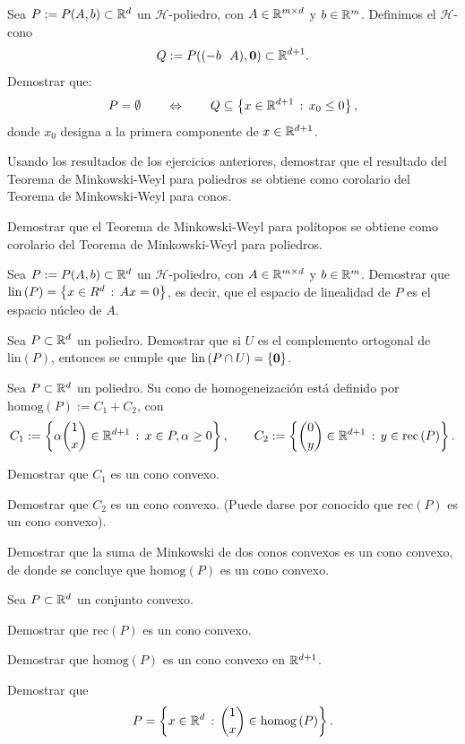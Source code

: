 \documentclass[a4paper,12pt]{article}
\newcommand{\colvector}[2]{{#1 \choose #2}}
\renewcommand{\lin}[1]{\mathrm{lin}\left(#1\right)}
\newcommand{\homog}[1]{\mathrm{homog}\left(#1\right)}
\newcommand{\rec}[1]{\mathrm{rec}\left(#1\right)}
\newcommand{\HH}{\mathcal{H}}
\begin{document}
\begin{exerciselist}
  \item Sea $P:= P(A, b) \subset \mathbb{R}^d$ un $\HH$-poliedro, con $A \in \mathbb{R}^{m \times d}$ y $b \in \mathbb{R}^m$. Definimos el $\HH$-cono
  $$
  Q := P((-b \,\,\,\, A), \mathord{\bf 0}) \subset \mathbb{R}^{d+1}.
  $$
  Demostrar que:
  $$
  P = \emptyset
  \qquad \Leftrightarrow \qquad
  Q \subseteq \left\{ x \in \mathbb{R}^{d+1} \, : \, x_0 \leq 0 \right\},
  $$
  donde $x_0$ designa a la primera componente de $x \in \mathbb{R}^{d+1}$.

  \item Usando los resultados de los ejercicios anteriores, demostrar que el resultado del Teorema de Minkowski-Weyl para poliedros se obtiene como corolario del Teorema de Minkowski-Weyl para conos.

  \item Demostrar que el Teorema de Minkowski-Weyl para polítopos se obtiene como corolario del Teorema de Minkowski-Weyl para poliedros.

  \item Sea $P:=P(A,b) \subset \mathbb{R}^d$ un $\HH$-poliedro, con $A \in \mathbb{R}^{m \times d}$ y $b \in \mathbb{R}^m$. Demostrar que $\lin{P} = \setof{x \in R^d}{Ax=0}$, es decir, que el espacio de linealidad de $P$ es el espacio núcleo de $A$.

  \item Sea $P \subset \mathbb{R}^d$ un poliedro. Demostrar que si $U$ es el complemento ortogonal de $\lin{P}$, entonces se cumple que $\lin{P \cap U} = \{ \zero \}$.

  \item Sea $P \subset \mathbb{R}^d$ un poliedro. Su cono de homogeneización está definido por $\homog{P}:= C_1 + C_2$, con
  $$
  C_1:= \setof{\alpha {1 \choose x} \in \RR^{d+1}}{x \in P, \alpha \geq 0},
  \qquad
  C_2:= \setof{{0 \choose y} \in \RR^{d+1}}{y \in \rec{P}}.
  $$
  \begin{exerciselist}
    \item Demostrar que $C_1$ es un cono convexo.
    \item Demostrar que $C_2$ es un cono convexo. (Puede darse por conocido que
    $\rec{P}$ es un cono convexo).
    \item Demostrar que la suma de Minkowski de dos conos convexos es un cono
    convexo, de donde se concluye que $\homog{P}$ es un cono convexo.
  \end{exerciselist}

 \item Sea $P \subset \mathbb{R}^d$ un conjunto convexo.
  \begin{exerciselist}
    \item Demostrar que $\rec{P}$ es un cono convexo.
    \item Demostrar que $\homog{P}$ es un cono convexo en $\mathbb{R}^{d+1}$.
    \item Demostrar que
    $$
    P = \setof{x \in \RR^d}{\colvector{1}{x} \in \homog{P}}.
    $$
  \end{exerciselist}


\end{exerciselist}
\end{document}
